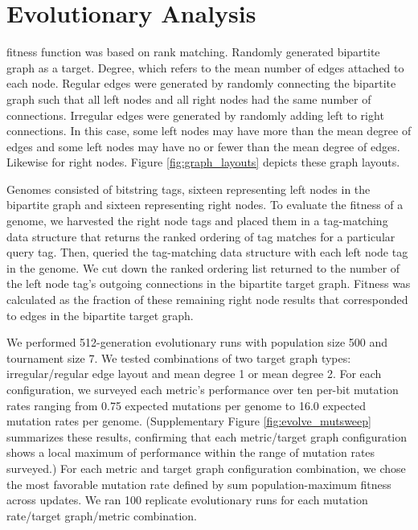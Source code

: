 \section{Evolutionary Analysis}



fitness function was based on rank matching.
Randomly generated bipartite graph as a target.
Degree, which refers to the mean number of edges attached to each node.
Regular edges were generated by randomly connecting the bipartite graph such that all left nodes and all right nodes had the same number of connections.
Irregular edges were generated by randomly adding left to right connections.
In this case, some left nodes may have more than the mean degree of edges and some left nodes may have no or fewer than the mean degree of edges.
Likewise for right nodes.
Figure \ref{fig:graph_layouts} depicts these graph layouts.

Genomes consisted of bitstring tags, sixteen representing left nodes in the bipartite graph and sixteen representing right nodes.
To evaluate the fitness of a genome, we harvested the right node tags and placed them in a tag-matching data structure that returns the ranked ordering of tag matches for a particular query tag.
Then, queried the tag-matching data structure with each left node tag in the genome.
We cut down the ranked ordering list returned to the number of the left node tag's outgoing connections in the bipartite target graph.
Fitness was calculated as the fraction of these remaining right node results that corresponded to edges in the bipartite target graph.

We performed 512-generation evolutionary runs with population size 500 and tournament size 7.
We tested combinations of two target graph types: irregular/regular edge layout and mean degree 1 or mean degree 2.
For each configuration, we surveyed each metric's performance over ten per-bit mutation rates ranging from 0.75 expected mutations per genome to 16.0 expected mutation rates per genome.
(Supplementary Figure \ref{fig:evolve_mutsweep} summarizes these results, confirming that each metric/target graph configuration shows a local maximum of performance within the range of mutation rates surveyed.)
For each metric and target graph configuration combination, we chose the most favorable mutation rate defined by sum population-maximum fitness across updates.
We ran 100 replicate evolutionary runs for each mutation rate/target graph/metric combination.



